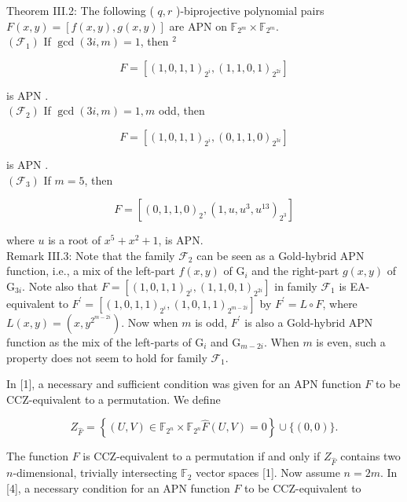 \documentclass[10pt]{article}
\begin{document}
Theorem III.2: The following ( $q, r$ )-biprojective polynomial pairs $F(x, y)=[f(x, y), g(x, y)]$ are APN on $\mathbb{F}_{2^{m}} \times \mathbb{F}_{2^{m}}$.\\
$\left(\mathcal{F}_{1}\right)$ If $\operatorname{gcd}(3 i, m)=1$, then ${ }^{2}$

$$
F=\left[(1,0,1,1)_{2^{i}},(1,1,0,1)_{2^{2 i}}\right]
$$

is APN .\\
$\left(\mathcal{F}_{2}\right)$ If $\operatorname{gcd}(3 i, m)=1, m$ odd, then

$$
F=\left[(1,0,1,1)_{2^{i}},(0,1,1,0)_{2^{3 i}}\right]
$$

is APN .\\
$\left(\mathcal{F}_{3}\right)$ If $m=5$, then

$$
F=\left[(0,1,1,0)_{2},\left(1, u, u^{3}, u^{13}\right)_{2^{3}}\right]
$$

where $u$ is a root of $x^{5}+x^{2}+1$, is APN.\\
Remark III.3: Note that the family $\mathcal{F}_{2}$ can be seen as a Gold-hybrid APN function, i.e., a mix of the left-part $f(x, y)$ of $\mathrm{G}_{i}$ and the right-part $g(x, y)$ of $\mathrm{G}_{3 i}$. Note also that $F= \left[(1,0,1,1)_{2^{i}},(1,1,0,1)_{2^{2 i}}\right]$ in family $\mathcal{F}_{1}$ is EA-equivalent to $F^{\prime}=\left[(1,0,1,1)_{2^{i}},(1,0,1,1)_{2^{m-2 i}}\right]$ by $F^{\prime}=L \circ F$, where $L(x, y)=\left(x, y^{2^{m-2 i}}\right)$. Now when $m$ is odd, $F^{\prime}$ is also a Gold-hybrid APN function as the mix of the left-parts of $\mathrm{G}_{i}$ and $\mathrm{G}_{m-2 i}$. When $m$ is even, such a property does not seem to hold for family $\mathcal{F}_{1}$.

In [1], a necessary and sufficient condition was given for an APN function $F$ to be CCZ-equivalent to a permutation. We define

$$
Z_{\widehat{F}}=\left\{(U, V) \in \mathbb{F}_{2^{n}} \times \mathbb{F}_{2^{n}} \widehat{F}(U, V)=0\right\} \cup\{(0,0)\} .
$$

The function $F$ is CCZ-equivalent to a permutation if and only if $Z_{\widehat{F}}$ contains two $n$-dimensional, trivially intersecting $\mathbb{F}_{2}$ vector spaces [1]. Now assume $n=2 m$. In [4], a necessary condition for an APN function $F$ to be CCZ-equivalent to
\end{document}
